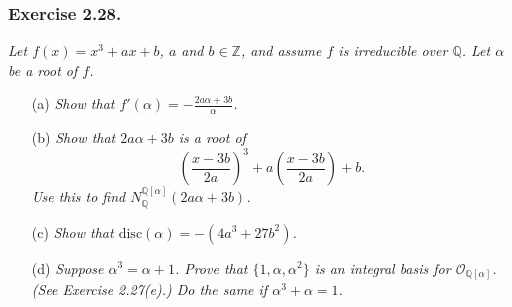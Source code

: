 \documentclass{article}
\begin{document}









\subsubsection*{Exercise 2.28.}
\emph{Let $f(x) = x^3+ax+b$, $a$ and $b \in \mathbb{Z}$,
and assume $f$ is irreducible over $\mathbb{Q}$.
Let $\alpha$ be a root of $f$.}
\begin{enumerate}
\item[(a)]
  \emph{Show that $f'(\alpha) = -\frac{2a\alpha+3b}{\alpha}$.}

\item[(b)]
  \emph{Show that $2a\alpha+3b$ is a root of
  $$\left( \frac{x-3b}{2a} \right)^3 + a\left( \frac{x-3b}{2a} \right) + b.$$
  Use this to find $N_{\mathbb{Q}}^{\mathbb{Q}[\alpha]} (2a\alpha+3b)$.}

\item[(c)]
  \emph{Show that $\textrm{disc}(\alpha) = -(4a^3+27b^2)$.}

\item[(d)]
  \emph{Suppose $\alpha^3=\alpha+1$.
  Prove that $\{1,\alpha,\alpha^2\}$ is an integral basis for $\mathcal{O}_{\mathbb{Q}[\alpha]}$.
  (See Exercise 2.27(e).)
  Do the same if $\alpha^3+\alpha=1$.} \\
\end{enumerate}
\end{document}
